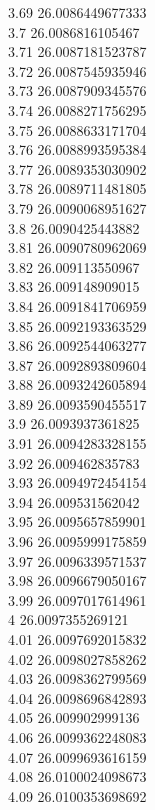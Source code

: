 {3.69	26.0086449677333\\
3.7	26.0086816105467\\
3.71	26.0087181523787\\
3.72	26.0087545935946\\
3.73	26.0087909345576\\
3.74	26.0088271756295\\
3.75	26.0088633171704\\
3.76	26.0088993595384\\
3.77	26.0089353030902\\
3.78	26.0089711481805\\
3.79	26.0090068951627\\
3.8	26.0090425443882\\
3.81	26.0090780962069\\
3.82	26.009113550967\\
3.83	26.009148909015\\
3.84	26.0091841706959\\
3.85	26.0092193363529\\
3.86	26.0092544063277\\
3.87	26.0092893809604\\
3.88	26.0093242605894\\
3.89	26.0093590455517\\
3.9	26.0093937361825\\
3.91	26.0094283328155\\
3.92	26.009462835783\\
3.93	26.0094972454154\\
3.94	26.009531562042\\
3.95	26.0095657859901\\
3.96	26.0095999175859\\
3.97	26.0096339571537\\
3.98	26.0096679050167\\
3.99	26.0097017614961\\
4	26.0097355269121\\
4.01	26.0097692015832\\
4.02	26.0098027858262\\
4.03	26.0098362799569\\
4.04	26.0098696842893\\
4.05	26.009902999136\\
4.06	26.0099362248083\\
4.07	26.0099693616159\\
4.08	26.0100024098673\\
4.09	26.0100353698692\\
}
